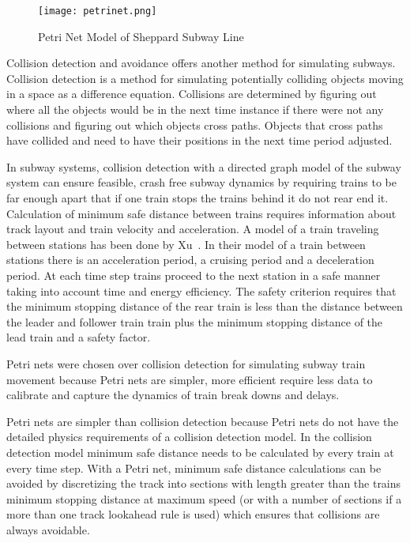\begin{figure}[htb]
	\centering
	\texttt{[image: petrinet.png]}
	\caption{Petri Net Model of Sheppard Subway Line}
	\label{fig:directedgraph}
\end{figure}

Collision detection and avoidance offers another method for simulating subways.
Collision detection is a method for simulating potentially colliding objects
moving in a space as a difference equation. Collisions are determined by
figuring out where all the objects would be in the next time instance if there
were not any collisions and figuring out which objects cross paths. Objects that
cross paths have collided and need to have their positions in the next time
period adjusted.

In subway systems, collision detection with a directed graph model of the subway
system can ensure feasible, crash free subway dynamics by requiring trains to be
far enough apart that if one train stops the trains behind it do not rear end
it. Calculation of minimum safe distance between trains requires information
about track layout and train velocity and acceleration. A model of a train
traveling between stations has been done by Xu~\cite{Xu2014}. In their model of
a train between stations there is an acceleration period, a cruising period and
a deceleration period. At each time step trains proceed to the next station in a
safe manner taking into account time and energy efficiency. The safety criterion
requires that the minimum stopping distance of the rear train is less than the
distance between the leader and follower train train plus the minimum stopping
distance of the lead train and a safety factor. 

Petri nets were chosen over collision detection for simulating subway train
movement because Petri nets are simpler, more efficient require less data to
calibrate and capture the dynamics of train break downs and delays. 

Petri nets are simpler than collision detection because Petri nets do not have
the detailed physics requirements of a collision detection model. In the
collision detection model minimum safe distance needs to be calculated by every
train at every time step. With a Petri net, minimum safe distance calculations
can be avoided by discretizing the track into sections with length greater than
the trains minimum stopping distance at maximum speed (or with a number of
sections if a more than one track lookahead rule is used) which ensures that
collisions are always avoidable. 

